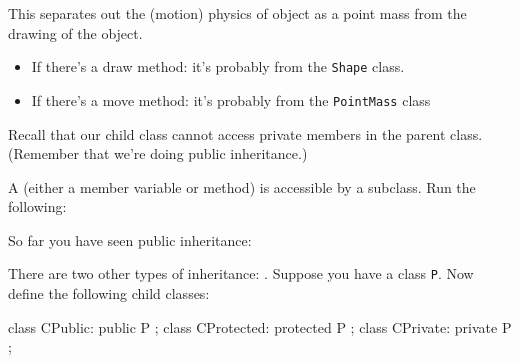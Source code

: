 This separates out the (motion) physics of object as a point mass from
the drawing of the object.

\begin{itemize}
\item
  If there's a draw method: it's
  probably from the \verb!Shape! class.
\item
  If there's a move method: it's
  probably from the \verb!PointMass! class
\end{itemize}

\newpage{}

Recall that our child class cannot access private members in the parent
class. (Remember that we're doing public inheritance.)

A  (either a member variable or method) is
accessible by a subclass. Run the following:

\newpage{}

So far you have seen public inheritance:

There are two other types of inheritance: . Suppose you have a class \verb!P!. Now define the following child classes:
\begin{console}
class CPublic: public P {};
class CProtected: protected P {};
class CPrivate: private P {}; 
\end{console}

